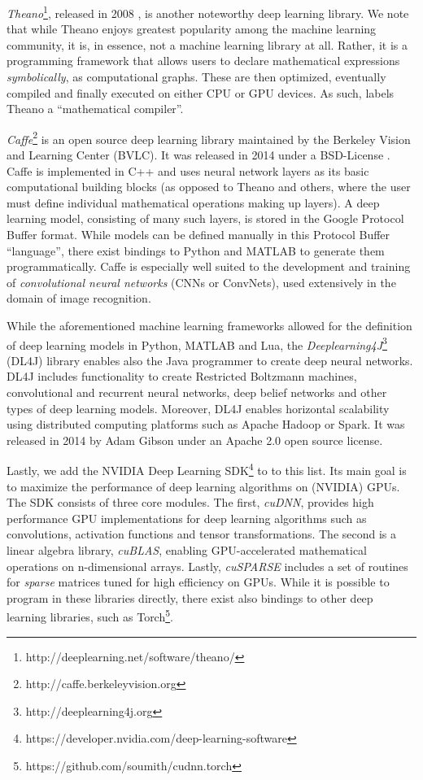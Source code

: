 \emph{Theano}\footnote{http://deeplearning.net/software/theano/}, released in
2008 \cite{theano}, is another noteworthy deep learning library. We note that
while Theano enjoys greatest popularity among the machine learning community, it
is, in essence, not a machine learning library at all. Rather, it is a
programming framework that allows users to declare mathematical expressions
\emph{symbolically}, as computational graphs. These are then optimized,
eventually compiled and finally executed on either CPU or GPU devices. As such,
\cite{theano} labels Theano a ``mathematical compiler''.

\emph{Caffe}\footnote{http://caffe.berkeleyvision.org} is an open source
deep learning library maintained by the Berkeley Vision and Learning Center
(BVLC). It was released in 2014 under a BSD-License \cite{caffe}. Caffe is
implemented in C++ and uses neural network layers as its basic computational
building blocks (as opposed to Theano and others, where the user must define
individual mathematical operations making up layers). A deep learning model,
consisting of many such layers, is stored in the Google Protocol Buffer
format. While models can be defined manually in this Protocol Buffer
``language'', there exist bindings to Python and MATLAB to generate them
programmatically. Caffe is especially well suited to the development and
training of \emph{convolutional neural networks} (CNNs or ConvNets), used
extensively in the domain of image recognition.

While the aforementioned machine learning frameworks allowed for the definition
of deep learning models in Python, MATLAB and Lua, the
\emph{Deeplearning4J}\footnote{http://deeplearning4j.org} (DL4J) library enables
also the Java programmer to create deep neural networks. DL4J includes
functionality to create Restricted Boltzmann machines, convolutional and
recurrent neural networks, deep belief networks and other types of deep learning
models. Moreover, DL4J enables horizontal scalability using distributed
computing platforms such as Apache Hadoop or Spark. It was released in 2014 by
Adam Gibson under an Apache 2.0 open source license.

Lastly, we add the NVIDIA Deep Learning
SDK\footnote{https://developer.nvidia.com/deep-learning-software} to to this
list. Its main goal is to maximize the performance of deep learning algorithms
on (NVIDIA) GPUs. The SDK consists of three core modules. The first,
\emph{cuDNN}, provides high performance GPU implementations for deep learning
algorithms such as convolutions, activation functions and tensor
transformations. The second is a linear algebra library, \emph{cuBLAS}, enabling
GPU-accelerated mathematical operations on n-dimensional arrays. Lastly,
\emph{cuSPARSE} includes a set of routines for \emph{sparse} matrices tuned for
high efficiency on GPUs. While it is possible to program in these libraries
directly, there exist also bindings to other deep learning libraries, such as
Torch\footnote{https://github.com/soumith/cudnn.torch}.

